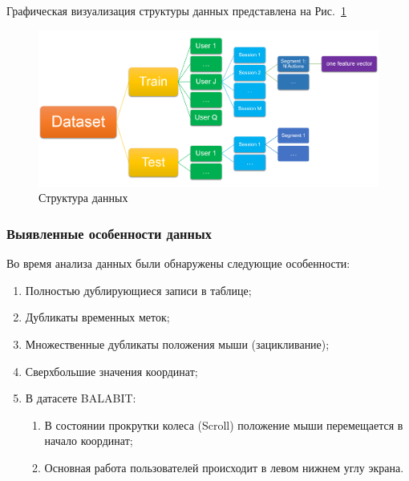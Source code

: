 \documentclass[12pt]{article}
\begin{document}
    \par Графическая визуализация структуры данных представлена на Рис.~\ref{sec:Research:Data:Description:fig:DataStructure}

    \begin{figure}[h!]
        \centering
        \includegraphics[width=\linewidth]{DataStructure.png}
        \caption{Структура данных}
        \label{sec:Research:Data:Description:fig:DataStructure}
    \end{figure}

    \newpage


    \subsubsection{Выявленные особенности данных}
    \label{sec:Research:Data:Features}

    \par Во время анализа данных были обнаружены следующие особенности:

    \begin{enumerate}
        \item Полностью дублирующиеся записи в таблице;
        \item Дубликаты временных меток;
        \item Множественные дубликаты положения мыши (зацикливание);
        \item Сверхбольшие значения координат;
        \item В датасете BALABIT:
        \begin{enumerate}
            \item В состоянии прокрутки колеса (Scroll) положение мыши перемещается в начало координат;
            \item Основная работа пользователей происходит в левом нижнем углу экрана.
        \end{enumerate}
    \end{enumerate}
\end{document}
